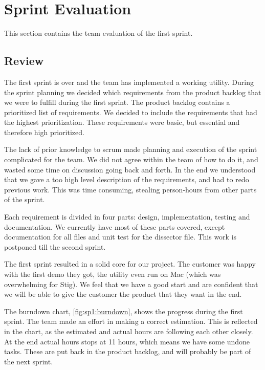 \section{Sprint Evaluation}
This section contains the team evaluation of the first sprint.

\subsection{Review}
The first sprint is over and the team has implemented a working utility. During
the sprint planning we decided which requirements from the product backlog that
we were to fulfill during the first sprint. The product backlog contains a
prioritized list of requirements. We decided to include the requirements that
had the highest prioritization. These requirements were basic, but essential
and therefore high prioritized.
   
The lack of prior knowledge to scrum made planning and execution of the sprint
complicated for the team. We did not agree within the team of how to do it, and
wasted some time on discussion going back and forth. In the end we understood
that we gave a too high level description of the requirements, and had to redo
previous work. This was time consuming, stealing person-hours from other parts
of the sprint.

Each requirement is divided in four parts: design, implementation, testing and
documentation. We currently have most of these parts covered, except
documentation for all files and unit test for the dissector file. This work is
postponed till the second sprint.

The first sprint resulted in a solid core for our project. The customer was
happy with the first demo they got, the utility even run on Mac (which was
overwhelming for Stig). We feel that we have a good start and are confident
that we will be able to give the customer the product that they want in the
end.

The burndown chart, \autoref{fig:sp1:burndown}, shows the progress during
the first sprint. The team made an effort in making a correct estimation. This
is reflected in the chart, as the estimated and actual hours are  following
each other closely. At the end actual hours stops at 11 hours, which means we
have some undone tasks. These are put back in the product backlog, and will
probably be part of the next sprint. 

